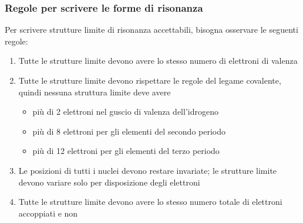 \subsubsection{Regole per scrivere le forme di risonanza}
Per scrivere strutture limite di risonanza accettabili, bisogna osservare le seguenti regole:
\begin{enumerate}
	\item Tutte le strutture limite devono avere lo stesso numero di elettroni di valenza
	\item Tutte le strutture limite devono rispettare le regole del legame covalente, quindi nessuna struttura limite deve avere
	      \begin{itemize}
		      \item più di 2 elettroni nel guscio di valenza dell'idrogeno
		      \item più di 8 elettroni per gli elementi del secondo periodo
		      \item più di 12 elettroni per gli elementi del terzo periodo
	      \end{itemize}
	\item Le posizioni di tutti i nuclei devono restare invariate; le strutture limite devono variare solo per disposizione degli elettroni
	\item Tutte le strutture limite devono avere lo stesso numero totale di elettroni accoppiati e non
\end{enumerate}